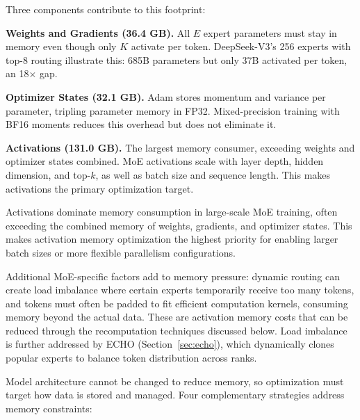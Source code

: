 \documentclass[10pt,logo,copyright]{nvidiatechreport}
\begin{document}
Three components contribute to this footprint:

\textbf{Weights and Gradients (36.4 GB).} All $E$ expert parameters must stay in memory even though only $K$ activate per token. DeepSeek-V3's 256 experts with top-8 routing illustrate this: 685B parameters but only 37B activated per token, an 18$\times$ gap.

\textbf{Optimizer States (32.1 GB).} Adam stores momentum and variance per parameter, tripling parameter memory in FP32. Mixed-precision training with BF16 moments reduces this overhead but does not eliminate it.

\textbf{Activations (131.0 GB).} The largest memory consumer, exceeding weights and optimizer states combined. MoE activations scale with layer depth, hidden dimension, and top-$k$, as well as batch size and sequence length. This makes activations the primary optimization target.

\begin{notebox}
Activations dominate memory consumption in large-scale MoE training, often exceeding the combined memory of weights, gradients, and optimizer states. This makes activation memory optimization the highest priority for enabling larger batch sizes or more flexible parallelism configurations.
\end{notebox}

Additional MoE-specific factors add to memory pressure: dynamic routing can create load imbalance where certain experts temporarily receive too many tokens, and tokens must often be padded to fit efficient computation kernels, consuming memory beyond the actual data. These are activation memory costs that can be reduced through the recomputation techniques discussed below. Load imbalance is further addressed by ECHO (Section~\ref{sec:echo}), which dynamically clones popular experts to balance token distribution across ranks.

Model architecture cannot be changed to reduce memory, so optimization must target how data is stored and managed. Four complementary strategies address memory constraints:
\end{document}
